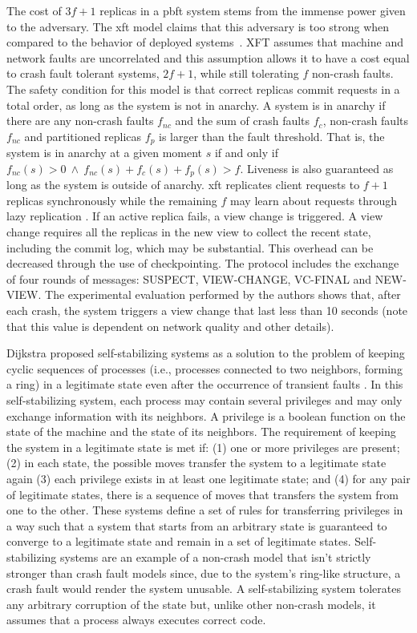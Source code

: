The cost of $3f+1$ replicas in a \acrshort{pbft} system stems from the immense power given to the adversary. The \acrfull{xft} model claims that this adversary is too strong when compared to the behavior of deployed systems~\cite{Liu2015}. XFT assumes that machine and network faults are uncorrelated and this assumption allows it to have a cost equal to crash fault tolerant systems, $2f+1$, while still tolerating $f$ non-crash faults. The safety condition for this model is that correct replicas commit requests in a total order, as long as the system is not in anarchy. A system is in anarchy if there are any non-crash faults $f_{nc}$ and the sum of crash faults $f_c$, non-crash faults $f_{nc}$ and partitioned replicas $f_p$ is larger than the fault threshold. That is, the system is in anarchy at a given moment $s$ if and only if $f_{nc}(s) > 0\ \land\ f_{nc}(s)+ f_c(s)+f_p(s) > f$. Liveness is also guaranteed as long as the system is outside of anarchy. \acrshort{xft} replicates client requests to $f+1$ replicas synchronously while the remaining $f$ may learn about requests through lazy replication \cite{Ladin1992}. If an active replica fails, a view change is triggered. A view change requires all the replicas in the new view to collect the recent state, including the commit log, which may be substantial. This overhead can be decreased through the use of checkpointing. The protocol includes the exchange of four rounds of messages: SUSPECT, VIEW-CHANGE, VC-FINAL and NEW-VIEW. The experimental evaluation performed by the authors shows that, after each crash, the system triggers a view change that last less than 10 seconds (note that this value is dependent on network quality and other details). \par
Dijkstra proposed self-stabilizing systems as a solution to the problem of keeping cyclic sequences of processes (i.e., processes connected to two neighbors, forming a ring) in a legitimate state even after the occurrence of transient faults \cite{Dijkstra1974}. In this self-stabilizing system, each process may contain several privileges and may only exchange information with its neighbors. A privilege is a boolean function on the state of the machine and the state of its neighbors. The requirement of keeping the system in a legitimate state is met if: (1) one or more privileges are present; (2) in each state, the possible moves transfer the system to a legitimate state again (3) each privilege exists in at least one legitimate state; and (4) for any pair of legitimate states, there is a sequence of moves that transfers the system from one to the other. These systems define a set of rules for transferring privileges in a way such that a system that starts from an arbitrary state is guaranteed to converge to a legitimate state and remain in a set of legitimate states. Self-stabilizing systems are an example of a non-crash model that isn't strictly stronger than crash fault models since, due to the system's ring-like structure, a crash fault would render the system unusable. A self-stabilizing system tolerates any arbitrary corruption of the state but, unlike other non-crash models, it assumes that a process always executes correct code.\par
